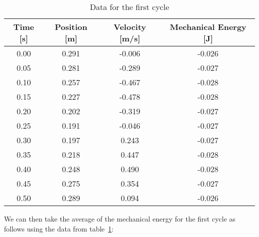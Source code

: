 \documentclass{article}
\begin{document}
            \begin{table}[H]
                \centering
                \begin{tabular}{|c|c|c|c|}
                    \hline
                    Time [s] & Position [m] & Velocity [m/s] & Mechanical Energy [J] \\
                    \hline
                    0.00     & 0.291        & -0.006         & -0.026                \\
                    \hline
                    0.05     & 0.281        & -0.289         & -0.027                \\
                    \hline
                    0.10     & 0.257        & -0.467         & -0.028                \\
                    \hline
                    0.15     & 0.227        & -0.478         & -0.028                \\
                    \hline
                    0.20     & 0.202        & -0.319         & -0.027                \\
                    \hline
                    0.25     & 0.191        & -0.046         & -0.027                \\
                    \hline
                    0.30     & 0.197        & 0.243          & -0.027                \\
                    \hline
                    0.35     & 0.218        & 0.447          & -0.028                \\
                    \hline
                    0.40     & 0.248        & 0.490          & -0.028                \\
                    \hline
                    0.45     & 0.275        & 0.354          & -0.027                \\
                    \hline
                    0.50     & 0.289        & 0.094          & -0.026                \\
                    \hline
                \end{tabular} %
                \caption{Data for the first cycle}\label{tab:first-cycle-mechanical-energy-table}
            \end{table}
            
            We can then take the average of the mechanical energy for the first cycle as follows using the data from table~\ref{tab:first-cycle-mechanical-energy-table}:
            
\end{document}
